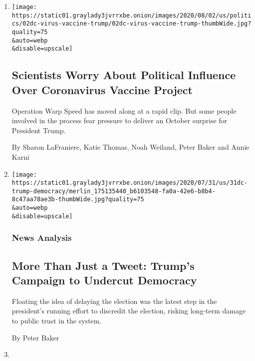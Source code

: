 \begin{enumerate}
\def\labelenumi{\arabic{enumi}.}
\item
  \href{/2020/08/02/us/politics/coronavirus-vaccine.html}{}

  \texttt{[image: https://static01.graylady3jvrrxbe.onion/images/2020/08/02/us/politics/02dc-virus-vaccine-trump/02dc-virus-vaccine-trump-thumbWide.jpg?quality=75\\\&auto=webp\\\&disable=upscale]}

  \hypertarget{scientists-worry-about-political-influence-over-coronavirus-vaccine-project}{%
  \subsection{Scientists Worry About Political Influence Over
  Coronavirus Vaccine
  Project}\label{scientists-worry-about-political-influence-over-coronavirus-vaccine-project}}

  Operation Warp Speed has moved along at a rapid clip. But some people
  involved in the process fear pressure to deliver an October surprise
  for President Trump.

  By Sharon LaFraniere, Katie Thomas, Noah Weiland, Peter Baker and
  Annie Karni
\item
  \href{/2020/07/31/us/politics/trump-tweet-democracy.html}{}

  \texttt{[image: https://static01.graylady3jvrrxbe.onion/images/2020/07/31/us/31dc-trump-democracy/merlin\_175135440\_b6103548-fa0a-42e6-b8b4-8c47aa78ae3b-thumbWide.jpg?quality=75\\\&auto=webp\\\&disable=upscale]}

  \hypertarget{news-analysis}{%
  \subsubsection{News Analysis}\label{news-analysis}}

  \hypertarget{more-than-just-a-tweet-trumps-campaign-to-undercut-democracy}{%
  \subsection{More Than Just a Tweet: Trump's Campaign to Undercut
  Democracy}\label{more-than-just-a-tweet-trumps-campaign-to-undercut-democracy}}

  Floating the idea of delaying the election was the latest step in the
  president's running effort to discredit the election, risking
  long-term damage to public trust in the system.

  By Peter Baker
\item
  \href{/2020/07/30/us/politics/trump-wallace.html}{}


\end{enumerate}
